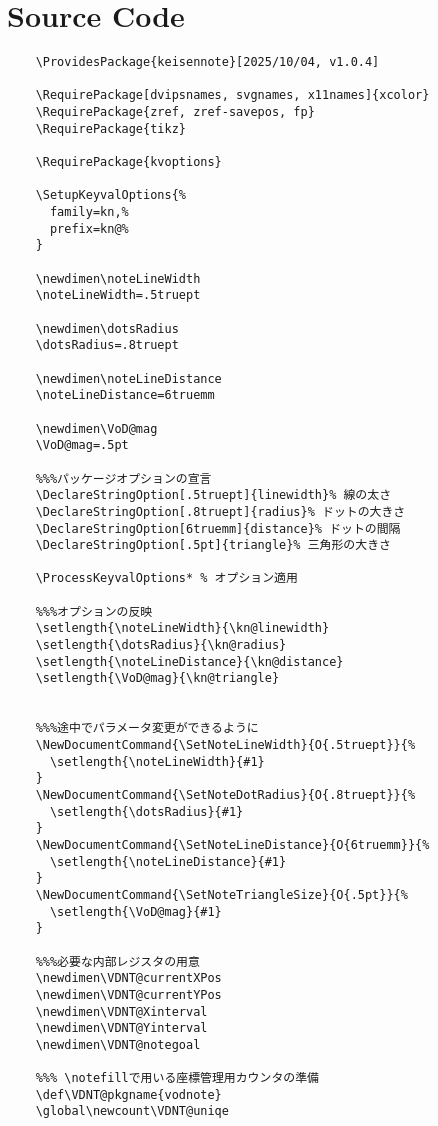 \documentclass[a4paper,12pt]{article}
\begin{document}
\section{Source Code}
  \begin{lstlisting}
    \ProvidesPackage{keisennote}[2025/10/04, v1.0.4]

    \RequirePackage[dvipsnames, svgnames, x11names]{xcolor}
    \RequirePackage{zref, zref-savepos, fp}
    \RequirePackage{tikz}

    \RequirePackage{kvoptions} 

    \SetupKeyvalOptions{%
      family=kn,%
      prefix=kn@%
    }

    \newdimen\noteLineWidth
    \noteLineWidth=.5truept

    \newdimen\dotsRadius
    \dotsRadius=.8truept

    \newdimen\noteLineDistance
    \noteLineDistance=6truemm

    \newdimen\VoD@mag
    \VoD@mag=.5pt

    %%%パッケージオプションの宣言
    \DeclareStringOption[.5truept]{linewidth}% 線の太さ
    \DeclareStringOption[.8truept]{radius}% ドットの大きさ
    \DeclareStringOption[6truemm]{distance}% ドットの間隔
    \DeclareStringOption[.5pt]{triangle}% 三角形の大きさ

    \ProcessKeyvalOptions* % オプション適用

    %%%オプションの反映
    \setlength{\noteLineWidth}{\kn@linewidth}
    \setlength{\dotsRadius}{\kn@radius}
    \setlength{\noteLineDistance}{\kn@distance}
    \setlength{\VoD@mag}{\kn@triangle}


    %%%途中でパラメータ変更ができるように
    \NewDocumentCommand{\SetNoteLineWidth}{O{.5truept}}{%
      \setlength{\noteLineWidth}{#1}
    }
    \NewDocumentCommand{\SetNoteDotRadius}{O{.8truept}}{%
      \setlength{\dotsRadius}{#1}
    }
    \NewDocumentCommand{\SetNoteLineDistance}{O{6truemm}}{%
      \setlength{\noteLineDistance}{#1}
    }
    \NewDocumentCommand{\SetNoteTriangleSize}{O{.5pt}}{%
      \setlength{\VoD@mag}{#1}
    }

    %%%必要な内部レジスタの用意
    \newdimen\VDNT@currentXPos
    \newdimen\VDNT@currentYPos
    \newdimen\VDNT@Xinterval
    \newdimen\VDNT@Yinterval
    \newdimen\VDNT@notegoal

    %%% \notefillで用いる座標管理用カウンタの準備
    \def\VDNT@pkgname{vodnote}
    \global\newcount\VDNT@uniqe



\end{lstlisting}
\end{document}
